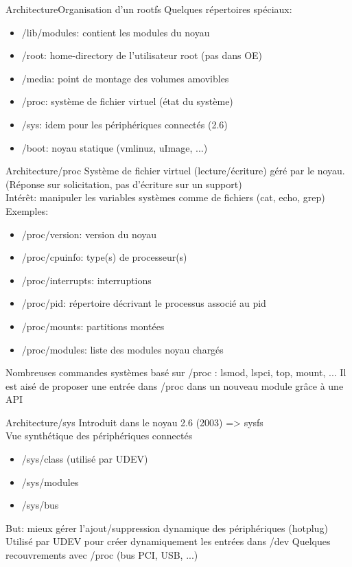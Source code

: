 \begin{frame}{Architecture}{Organisation d'un rootfs}	
	Quelques répertoires spéciaux:
	\begin{itemize}
		\item
			/lib/modules: contient les modules du noyau
		\item
			/root: home-directory de l'utilisateur root (pas dans OE)
		\item
			/media: point de montage des volumes amovibles
		\item
			/proc: système de fichier virtuel (état du système)
		\item
			/sys: idem pour les périphériques connectés (2.6)
		\item
			/boot: noyau statique (vmlinuz, uImage, ...)
	\end{itemize}
\end{frame}

\begin{frame}{Architecture}{/proc}
	Système de fichier virtuel (lecture/écriture) géré par le noyau. (Réponse sur solicitation, pas d'écriture sur un support)\\
	Intérêt: manipuler les variables systèmes comme de fichiers (cat, echo, grep)\\
	Exemples:
	\begin{itemize}
		\item
			/proc/version: version du noyau
		\item
			/proc/cpuinfo: type(s) de processeur(s)
		\item
			/proc/interrupts: interruptions
		\item
			/proc/pid: répertoire décrivant le processus associé au pid
		\item
			/proc/mounts: partitions montées
		\item
			/proc/modules: liste des modules noyau chargés
	\end{itemize}
	Nombreuses commandes systèmes basé sur /proc : lsmod, lspci, top, mount, ...
	Il est aisé de proposer une entrée dans /proc dans un nouveau module grâce à une API
\end{frame}

\begin{frame}{Architecture}{/sys}
	Introduit dans le noyau 2.6 (2003) => sysfs\\
	Vue synthétique des périphériques connectés\\
	\begin{itemize}
		\item
			/sys/class (utilisé par UDEV)
		\item
			/sys/modules
		\item
			/sys/bus
	\end{itemize}		
	But: mieux gérer l'ajout/suppression dynamique des périphériques (hotplug)
	Utilisé par UDEV pour créer dynamiquement les entrées dans /dev 
	Quelques recouvrements avec /proc (bus PCI, USB, ...)
\end{frame}